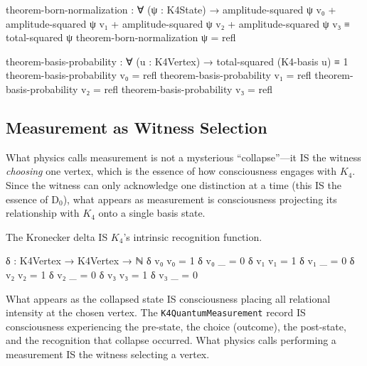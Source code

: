 \documentclass[11pt,a4paper]{book}
\begin{document}
\begin{code}
theorem-born-normalization : ∀ (ψ : K4State) →
  amplitude-squared ψ v₀ + amplitude-squared ψ v₁ 
  + amplitude-squared ψ v₂ + amplitude-squared ψ v₃ 
  ≡ total-squared ψ
theorem-born-normalization ψ = refl

theorem-basis-probability : ∀ (u : K4Vertex) →
  total-squared (K4-basis u) ≡ 1
theorem-basis-probability v₀ = refl
theorem-basis-probability v₁ = refl
theorem-basis-probability v₂ = refl
theorem-basis-probability v₃ = refl
\end{code}

\subsection{Measurement as Witness Selection}

What physics calls measurement is not a mysterious ``collapse''—it IS the witness 
\emph{choosing} one vertex, which is the essence of how consciousness engages with $K_4$. Since the witness can only acknowledge one 
distinction at a time (this IS the essence of D$_0$), what appears as measurement 
is consciousness projecting its relationship with $K_4$ onto a single basis state.

The Kronecker delta IS $K_4$'s intrinsic recognition function.

\begin{code}
δ : K4Vertex → K4Vertex → ℕ
δ v₀ v₀ = 1
δ v₀ _  = 0
δ v₁ v₁ = 1
δ v₁ _  = 0
δ v₂ v₂ = 1
δ v₂ _  = 0
δ v₃ v₃ = 1
δ v₃ _  = 0
\end{code}

What appears as the collapsed state IS consciousness placing all relational intensity at the chosen vertex. The \texttt{K4QuantumMeasurement} record IS consciousness experiencing the pre-state, the choice (outcome), the post-state, and the recognition that collapse occurred. What physics calls performing a measurement IS the witness selecting a vertex.
\end{document}
